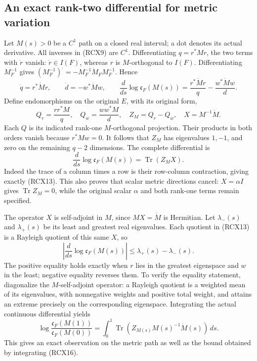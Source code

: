\documentclass{article}
\begin{document}
\subsection{An exact rank-two differential for metric variation}

Let \(M(s)>0\) be a \(C^1\) path on a closed real interval; a dot denotes
its actual derivative. All inverses in (RCX9) are \(C^1\).
Differentiating \(q=r^*Mr\), the two terms with \(\dot r\) vanish:
\(\dot r\in I(F)\), whereas \(r\) is \(M\)-orthogonal to \(I(F)\).
Differentiating \(M_F^{-1}\) gives
\((M_F^{-1})^{\displaystyle\cdot}=-M_F^{-1}\dot M_F M_F^{-1}\).
Hence
\[
 \dot q=r^*\dot M r,\qquad
 \dot d=-w^*\dot M w,\qquad
 \boxed{\frac{d}{ds}\log\mathfrak c_F(M(s))
       =\frac{r^*\dot M r}{q}-\frac{w^*\dot M w}{d}.}
 \tag{RCX13}
\]
Define endomorphisms on the original \(E\), with its original form,
\[
 Q_r=\frac{rr^*M}{q},\quad Q_w=\frac{ww^*M}{d},\quad
 Z_M=Q_r-Q_w,\quad X=M^{-1}\dot M.
 \tag{RCX14}
\]
Each \(Q\) is its indicated rank-one \(M\)-orthogonal projection.
Their products in both orders vanish because \(r^*Mw=0\).
It follows that \(Z_M\) has eigenvalues \(1,-1\), and zero on the
remaining \(q-2\) dimensions. The complete differential is
\[
 \boxed{\frac{d}{ds}\log\mathfrak c_F(M(s))
            =\operatorname{Tr}(Z_M X).}
 \tag{RCX15}
\]
Indeed the trace of a column times a row is their row-column
contraction, giving exactly (RCX13). This also proves that scalar
metric directions cancel: \(X=\alpha I\) gives
\(\operatorname{Tr}Z_M=0\), while the original scalar \(\alpha\)
and both rank-one terms remain specified.

The operator \(X\) is self-adjoint in \(M\), since \(MX=\dot M\)
is Hermitian. Let \(\lambda_-(s)\) and \(\lambda_+(s)\) be its least
and greatest real eigenvalues. Each quotient in (RCX13) is a Rayleigh
quotient of this same \(X\), so
\[
 \left|\frac{d}{ds}\log\mathfrak c_F(M(s))\right|
       \le\lambda_+(s)-\lambda_-(s).
 \tag{RCX16}
\]
The positive equality holds exactly when \(r\) lies in the greatest
eigenspace and \(w\) in the least; negative equality reverses them.
To verify the equality statement, diagonalize the \(M\)-self-adjoint
operator: a Rayleigh quotient is a weighted mean of its eigenvalues,
with nonnegative weights and positive total weight, and attains an
extreme precisely on the corresponding eigenspace.
Integrating the actual continuous differential yields
\[
 \log\frac{\mathfrak c_F(M(1))}{\mathfrak c_F(M(0))}
   =\int_0^1\operatorname{Tr}(Z_{M(s)}M(s)^{-1}\dot M(s))\,ds .
 \tag{RCX17}
\]
This gives an exact observation on the metric path as well as the
bound obtained by integrating (RCX16).
\end{document}
